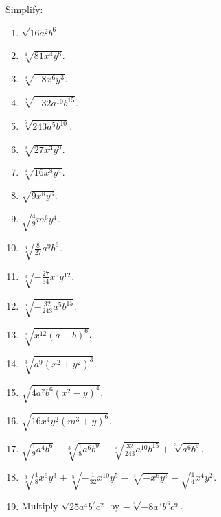 \documentclass{book}
\begin{document}
Simplify:

\begin{enumerate}

\item $\sqrt{16 a^{2} b^{6}}$.

\item $\sqrt[4]{81 x^{4} y^{8}}$.

\item $\sqrt[3]{-8 x^{6} y^{3}}$.

\item $\sqrt[5]{-32 a^{10} b^{15}}$.

\item $\sqrt[5]{243 a^{5} b^{10}}$.

\item $\sqrt[3]{27 x^{3} y^{9}}$.

\item $\sqrt[4]{16 x^{8} y^{4}}$.

\item $\sqrt{9 x^{8} y^{6}}$.

\item $\sqrt{\frac{4}{9} m^{6} y^{4}}$.

\item $\sqrt[3]{\frac{8}{27} a^{9} b^{6}}$.

\item $\sqrt[3]{-\frac{27}{64} x^{9} y^{12}}$.

\item $\sqrt[5]{-\frac{32}{243} a^{5} b^{15}}$.

\item $\sqrt[6]{x^{12} \left(a - b \right)^{6}}$.

\item $\sqrt[3]{a^9 \left(x^{2} + y^{2} \right)^{3}}$.

\item $\sqrt{4 a^{2} b^{6} \left(x^{2} - y \right)^{4}}$.

\item $\sqrt{16 x^{4} y^{2} \left(m^{3} + y \right)^{6}}$.

\item $\sqrt{\frac{1}{9} a^{4} b^{6}} - \sqrt[3]{\frac{1}{8} a^{6}
b^{9}} - \sqrt[5]{\frac{32}{243} a^{10} b^{15}} + \sqrt[3]{a^{6}
b^{9}}$.

\item $ \sqrt[3]{\frac{1}{8} x^{6} y^{3}}
          + \sqrt[5]{-\frac{1}{32} x^{10} y^{5}}
          - \sqrt[3]{-x^{6} y^{3}}
          - \sqrt{\frac{1}{4} x^{4} y^{2}} $.

\item Multiply $\sqrt{25 a^{4} b^{2} c^{2}}$ by $-\sqrt[3]{-8
a^{3} b^{6} c^{9}}$.


\end{enumerate}
\end{document}
